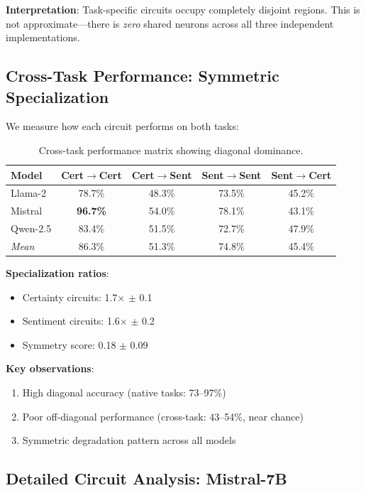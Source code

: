 \documentclass{article}
\begin{document}
\textbf{Interpretation}: Task-specific circuits occupy completely disjoint regions. This is not approximate—there is \textit{zero} shared neurons across all three independent implementations.

\subsection{Cross-Task Performance: Symmetric Specialization}

We measure how each circuit performs on both tasks:

\begin{table}[h]
\centering
\begin{tabular}{@{}lcccc@{}}
\toprule
\textbf{Model} & \textbf{Cert$\rightarrow$Cert} & \textbf{Cert$\rightarrow$Sent} & \textbf{Sent$\rightarrow$Sent} & \textbf{Sent$\rightarrow$Cert} \\
\midrule
Llama-2 & 78.7\% & 48.3\% & 73.5\% & 45.2\% \\
Mistral & \textbf{96.7\%} & 54.0\% & 78.1\% & 43.1\% \\
Qwen-2.5 & 83.4\% & 51.5\% & 72.7\% & 47.9\% \\
\midrule
\textit{Mean} & 86.3\% & 51.3\% & 74.8\% & 45.4\% \\
\bottomrule
\end{tabular}
\caption{Cross-task performance matrix showing diagonal dominance.}
\label{tab:crosstask}
\end{table}

\textbf{Specialization ratios}:
\begin{itemize}
    \item Certainty circuits: 1.7$\times$ $\pm$ 0.1
    \item Sentiment circuits: 1.6$\times$ $\pm$ 0.2
    \item Symmetry score: 0.18 $\pm$ 0.09
\end{itemize}

\textbf{Key observations}:
\begin{enumerate}
    \item High diagonal accuracy (native tasks: 73--97\%)
    \item Poor off-diagonal performance (cross-task: 43--54\%, near chance)
    \item Symmetric degradation pattern across all models
\end{enumerate}

\subsection{Detailed Circuit Analysis: Mistral-7B}
\end{document}

